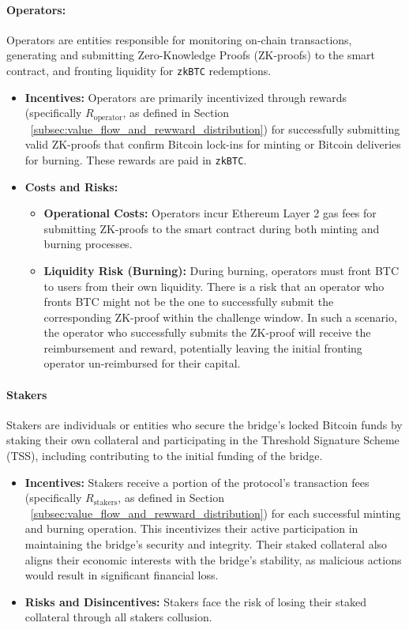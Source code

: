 \documentclass{DESSThesis}
\newcommand{\zktoken}{\texttt{zkBTC}}
\begin{document}
\paragraph{Operators:}
Operators are entities responsible for monitoring on-chain transactions, generating and submitting Zero-Knowledge Proofs (ZK-proofs) to the smart contract, and fronting liquidity for \texttt{\zktoken} redemptions.
\begin{itemize}
    \item \textbf{Incentives:} Operators are primarily incentivized through rewards (specifically \(R_{\text{operator}}\allowbreak\), as defined in Section ~\ref{subsec:value_flow_and_rewward_distribution}) for successfully submitting valid ZK-proofs that confirm Bitcoin lock-ins for minting or Bitcoin deliveries for burning. These rewards are paid in \texttt{\zktoken}.
    \item \textbf{Costs and Risks:}
        \begin{itemize}
            \item \textbf{Operational Costs:} Operators incur Ethereum Layer 2 gas fees for submitting ZK-proofs to the smart contract during both minting and burning processes.
            \item \textbf{Liquidity Risk (Burning):} During burning, operators must front BTC to users from their own liquidity. There is a risk that an operator who fronts BTC might not be the one to successfully submit the corresponding ZK-proof within the challenge window. In such a scenario, the operator who successfully submits the ZK-proof will receive the reimbursement and reward, potentially leaving the initial fronting operator un-reimbursed for their capital.
        \end{itemize}
\end{itemize}    
    

\paragraph{Stakers}
Stakers are individuals or entities who secure the bridge's locked Bitcoin funds by staking their own collateral and participating in the Threshold Signature Scheme (TSS), including contributing to the initial funding of the bridge.
\begin{itemize}
    \item \textbf{Incentives:} Stakers receive a portion of the protocol's transaction fees (specifically \(R_{\text{stakers}}\), as defined in Section ~\ref{subsec:value_flow_and_rewward_distribution}) for each successful minting and burning operation. This incentivizes their active participation in maintaining the bridge's security and integrity. Their staked collateral also aligns their economic interests with the bridge's stability, as malicious actions would result in significant financial loss.
    \item \textbf{Risks and Disincentives:} Stakers face the risk of losing their staked collateral through all stakers collusion.
\end{itemize}
\end{document}

